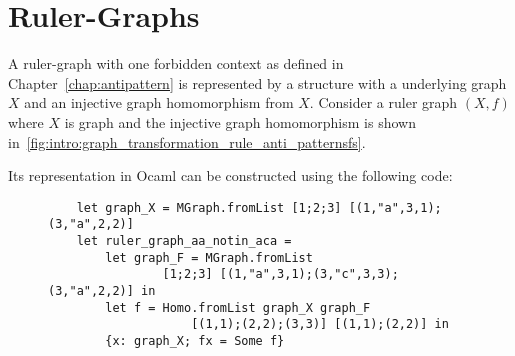 \section{Ruler-Graphs}
A ruler-graph with one forbidden context as defined in Chapter~\ref{chap:antipattern} is represented by a structure with a underlying graph $X$ and an injective graph homomorphism from $X$. 
Consider a ruler graph $(X, f)$ where $X$ is graph  
and the injective graph homomorphism is shown in~\autoref{fig:intro:graph_transformation_rule_anti_patternsfs}.
 \begin{figure}[H]
    \centering
  \caption{}
  \label{fig:intro:graph_transformation_rule_anti_patternsfs}
 \end{figure} 
Its representation in Ocaml
        can be constructed using the following code:
\begin{figure}[H]
\begin{verbatim} 
    let graph_X = MGraph.fromList [1;2;3] [(1,"a",3,1);(3,"a",2,2)]
    let ruler_graph_aa_notin_aca = 
        let graph_F = MGraph.fromList 
                [1;2;3] [(1,"a",3,1);(3,"c",3,3);(3,"a",2,2)] in
        let f = Homo.fromList graph_X graph_F 
                    [(1,1);(2,2);(3,3)] [(1,1);(2,2)] in
        {x: graph_X; fx = Some f}
\end{verbatim}
    \caption{}
    \label{fig:implemented:ruler_graph_representation}
\end{figure}

